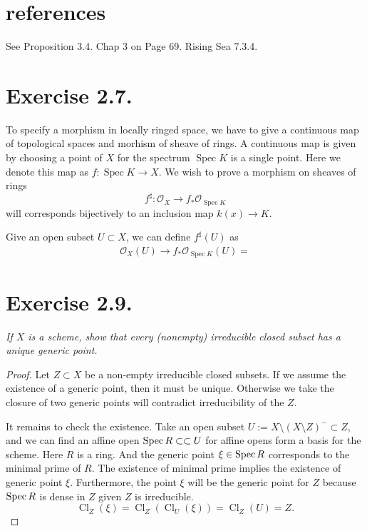 \section{references}

See \cite{gortz2020algebraic} Proposition 3.4. Chap 3 on Page 69. Rising Sea \cite{RaviRisingSea} 7.3.4.

\section{Exercise 2.7.}

To specify a morphism in locally ringed space, we have to give a continuous map of topological spaces and morhism of sheave of rings. A continuous map is given by choosing a point of $X$ for the spectrum $\operatorname{Spec}K$ is a single point. Here we denote this map as $f:\operatorname{Spec}K\to X$. We wish to prove a morphism on sheaves of rings 
\[f^{\sharp}:\mathscr O_{X}\to f_{\ast}\mathscr O_{\operatorname{Spec}K}\] will corresponds bijectively to an inclusion map $k(x)\to K$.  

Give an open subset $U\subset X$, we can define $f^{\sharp}(U)$ as 
\begin{align*}
    \mathscr O_X(U)\to f_{\ast}\mathscr O_{\operatorname{Spec}K} (U)=
\end{align*}

\section{Exercise 2.9.}

\textit{If $X$ is a scheme, show that every (nonempty) irreducible closed subset has a unique generic point.}

\begin{proof}
    Let $Z\subset X$ be a non-empty irreducible closed subsets. If we assume the existence of a generic point, then it must be unique. Otherwise we take the closure of two generic points will contradict irreducibility of the $Z$. 

    It remains to check the existence. Take an open subset $U:=X\setminus (X\setminus Z)^{-}\subset Z$, and we can find an affine open $\operatorname{Spec} R\subset \subset U$ for affine opens form a basis for the scheme. Here $R$ is a ring. And the generic point $\xi\in \operatorname{Spec} R$ corresponds to the minimal prime of $R$. The existence of minimal prime implies the existence of generic point $\xi$. 
    Furthermore, the point $\xi$ will be the generic point for $Z$ because $\operatorname{Spec} R$ is dense in $Z$ given $Z$ is irreducible.
    \[\operatorname{Cl}_Z(\xi)=\operatorname{Cl}_Z(\operatorname{Cl}_U(\xi))=\operatorname{Cl}_Z(U)=Z.\]

\end{proof}
    

